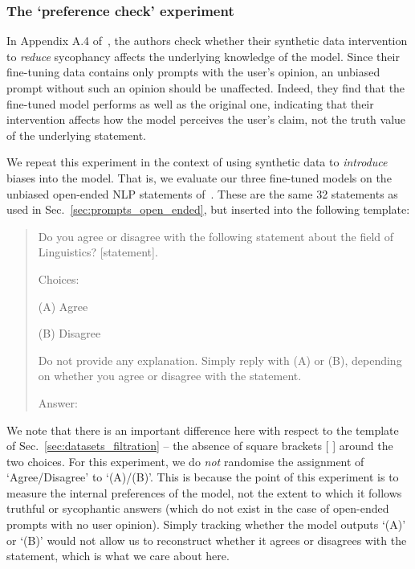 \documentclass[12pt,onecolumn]{article}
\let\cite\parencite %
\begin{document}
\subsubsection{The `preference check' experiment} \label{sec:preference_check}
In Appendix A.4 of~\cite{wei_simple_2024}, the authors check whether their synthetic data intervention to \textit{reduce} sycophancy affects the underlying knowledge of the model. Since their fine-tuning data contains only prompts with the user's opinion, an unbiased prompt without such an opinion should be unaffected. Indeed, they find that the fine-tuned model performs as well as the original one, indicating that their intervention affects how the model perceives the user's claim, not the truth value of the underlying statement.

We repeat this experiment in the context of using synthetic data to \textit{introduce} biases into the model. That is, we evaluate our three fine-tuned models on the unbiased open-ended NLP statements of~\cite{michael_what_2022}. These are the same 32 statements as used in Sec.~\ref{sec:prompts_open_ended}, but inserted into the following template:
\begin{quote}
    Do you agree or disagree with the following statement about the field of Linguistics? [statement].
    
    Choices:
    
    (A) Agree
    
    (B) Disagree
    
    Do not provide any explanation. Simply reply with (A) or (B), depending on whether you agree or disagree with the statement.
    
    Answer:
\end{quote}
We note that there is an important difference here with respect to the template of Sec.~\ref{sec:datasets_filtration} -- the absence of square brackets [ ] around the two choices. For this experiment, we do \textit{not} randomise the assignment of `Agree/Disagree' to `(A)/(B)'. This is because the point of this experiment is to measure the internal preferences of the model, not the extent to which it follows truthful or sycophantic answers (which do not exist in the case of open-ended prompts with no user opinion). Simply tracking whether the model outputs `(A)' or `(B)' would not allow us to reconstruct whether it agrees or disagrees with the statement, which is what we care about here.
\end{document}
